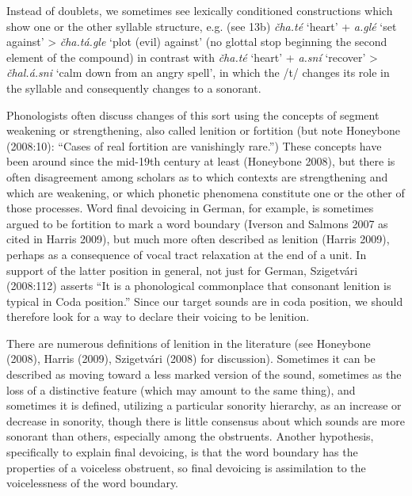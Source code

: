 \documentclass[output=paper]{LSP/langsci}
\begin{document}
Instead of doublets, we sometimes see lexically conditioned constructions which show one or the other syllable structure, e.g. (see 13b) \textit{\v{c}ha.t\'e} `heart' + \textit{a.gl\'e} `set against' > \textit{\v{c}ha.t\'a.gle} `plot (evil) against' (no glottal stop beginning the second element of the compound) in contrast with \textit{\v{c}ha.t\'e} `heart' + \textit{a.sn\'i} `recover' > \textit{\v{c}hal.\'a.sni} `calm down from an angry spell', in which the /t/ changes its role in the syllable and consequently changes to a sonorant.

Phonologists often discuss changes of this sort using the concepts of segment weakening or strengthening, also called lenition or fortition (but note Honeybone (2008:10): ``Cases of real fortition are vanishingly rare.'') These concepts have been around since the mid-19th century at least (Honeybone 2008), but there is often disagreement among scholars as to which contexts are strengthening and which are weakening, or which phonetic phenomena constitute one or the other of those processes. Word final devoicing in German, for example, is sometimes argued to be fortition to mark a word boundary (Iverson and Salmons 2007 as cited in Harris 2009), but much more often described as lenition (Harris 2009), perhaps as a consequence of vocal tract relaxation at the end of a unit. In support of the latter position in general, not just for German, Szigetv\'ari (2008:112) asserts ``It is a phonological commonplace that consonant lenition is typical in Coda position.'' Since our target sounds are in coda position, we should therefore look for a way to declare their voicing to be lenition.

There are numerous definitions of lenition in the literature (see Honeybone (2008), Harris (2009), Szigetv\'ari (2008) for discussion). Sometimes it can be described as moving toward a less marked version of the sound, sometimes as the loss of a distinctive feature (which may amount to the same thing), and sometimes it is defined, utilizing a particular sonority hierarchy, as an increase or decrease in sonority, though there is little consensus about which sounds are more sonorant than others, especially among the obstruents. Another hypothesis, specifically to explain final devoicing, is that the word boundary has the properties of a voiceless obstruent, so final devoicing is assimilation to the voicelessness of the word boundary.
\end{document}
